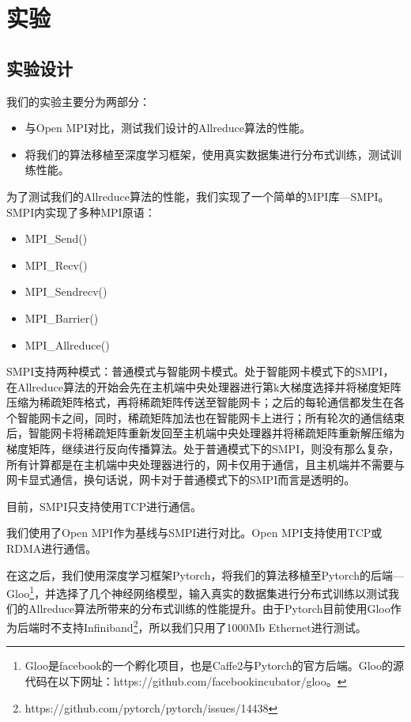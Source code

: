 \chapter{实验}
\label{chap4}

\section{实验设计}
我们的实验主要分为两部分：
\begin{itemize}
    \item 与Open MPI对比，测试我们设计的Allreduce算法的性能。
    \item 将我们的算法移植至深度学习框架，使用真实数据集进行分布式训练，测试训练性能。
\end{itemize}

为了测试我们的Allreduce算法的性能，我们实现了一个简单的MPI库---SMPI。SMPI内实现了多种MPI原语：
\begin{itemize}
    \item MPI\_Send()
    \item MPI\_Recv()
    \item MPI\_Sendrecv()
    \item MPI\_Barrier()
    \item MPI\_Allreduce()
\end{itemize}

SMPI支持两种模式：普通模式与智能网卡模式。处于智能网卡模式下的SMPI，在Allreduce算法的开始会先在主机端中央处理器进行第k大梯度选择并将梯度矩阵压缩为稀疏矩阵格式，再将稀疏矩阵传送至智能网卡；之后的每轮通信都发生在各个智能网卡之间，同时，稀疏矩阵加法也在智能网卡上进行；所有轮次的通信结束后，智能网卡将稀疏矩阵重新发回至主机端中央处理器并将稀疏矩阵重新解压缩为梯度矩阵，继续进行反向传播算法。处于普通模式下的SMPI，则没有那么复杂，所有计算都是在主机端中央处理器进行的，网卡仅用于通信，且主机端并不需要与网卡显式通信，换句话说，网卡对于普通模式下的SMPI而言是透明的。

目前，SMPI只支持使用TCP进行通信。

我们使用了Open MPI作为基线与SMPI进行对比。Open MPI支持使用TCP或RDMA进行通信。

在这之后，我们使用深度学习框架Pytorch，将我们的算法移植至Pytorch的后端---Gloo\footnote{Gloo是facebook的一个孵化项目，也是Caffe2与Pytorch的官方后端。Gloo的源代码在以下网址：https://github.com/facebookincubator/gloo。}，并选择了几个神经网络模型，输入真实的数据集进行分布式训练以测试我们的Allreduce算法所带来的分布式训练的性能提升。由于Pytorch目前使用Gloo作为后端时不支持Infiniband\footnote{https://github.com/pytorch/pytorch/issues/14438}，所以我们只用了1000Mb Ethernet进行测试。

